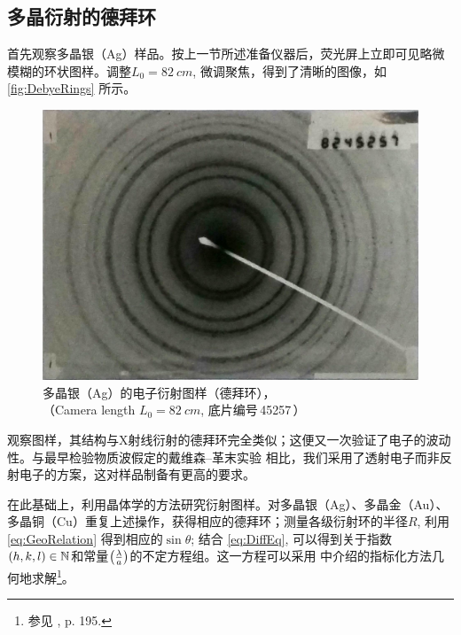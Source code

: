 \documentclass[aps,pre,12pt,preprint,%
	onecolumn,showpacs,showkeys,nofootinbib]{revtex4-1}
\begin{document}
\subsection{多晶衍射的德拜环}
	首先观察多晶银（Ag）样品。按上一节所述准备仪器后，荧光屏上立即可见略微模糊的环状图样。调整$L_0 = \SI{82}{cm}$, 微调聚焦，得到了清晰的图像，如 \autoref{fig:DebyeRings} 所示。
	
	\begin{figure}[!ht]
	\centering
	\includegraphics[width=.7\linewidth]{DebyeRings}
	\caption{多晶银（\textup{Ag}）的电子衍射图样（德拜环），\\
		（Camera length $L_0 = \SI{82}{cm}$, 
		底片编号\textnumero\,45257\,）}
	\label{fig:DebyeRings}
	\end{figure}
\FloatBarrier
	
	观察图样，其结构与X射线衍射的德拜环完全类似；这便又一次验证了电子的波动性。与最早检验物质波假定的戴维森--革末实验 \cite{davisson1927diffraction} 相比，我们采用了透射电子而非反射电子的方案，这对样品制备有更高的要求。
	
	\newparagraph
	在此基础上，利用晶体学的方法研究衍射图样。对多晶银（Ag）、多晶金（Au）、多晶铜（Cu）重复上述操作，获得相应的德拜环；测量各级衍射环的半径$R$, 利用 \eqref{eq:GeoRelation} 得到相应的$\sin\theta$; 结合 \eqref{eq:DiffEq}, 可以得到关于指数$(h,k,l) \in \mathbb{N}$和常量$\pqty{\frac{\lambda}{a}}$的不定方程组。这一方程可以采用 \cite{textbook} 中介绍的指标化方法几何地求解\footnote{%
		参见 \cite{textbook}, p. 195. }。
	
\end{document}
